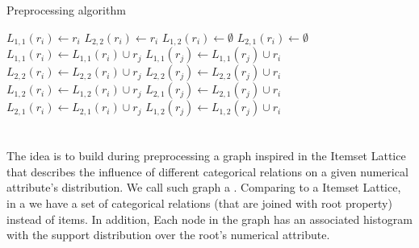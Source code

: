 \begin{algorithm}[!h]
  \caption{Preprocessing algorithm}
  \label{alg3}

     {
      $L_{1,1}(r_i) \leftarrow r_i$ \;
      $L_{2,2}(r_i) \leftarrow r_i$ \;
      $L_{1,2}(r_i) \leftarrow \emptyset$ \;
      $L_{2,1}(r_i) \leftarrow \emptyset$ \;
    }
     {
	 {
	     {
		 {
		    $L_{1,1}(r_i) \leftarrow L_{1,1}(r_i) \cup r_j$ \;
		    $L_{1,1}(r_j) \leftarrow L_{1,1}(r_j) \cup r_i$ \;
		}
		 {
		    $L_{2,2}(r_i) \leftarrow L_{2,2}(r_i) \cup r_j$ \;
		    $L_{2,2}(r_j) \leftarrow L_{2,2}(r_j) \cup r_i$ \;
		}
	    }
	     {
		$L_{1,2}(r_i) \leftarrow L_{1,2}(r_i) \cup r_j$ \;
		$L_{2,1}(r_j) \leftarrow L_{2,1}(r_j) \cup r_i$ \;
	    }
	     {
		$L_{2,1}(r_i) \leftarrow L_{2,1}(r_i) \cup r_j$ \;
		$L_{1,2}(r_j) \leftarrow L_{1,2}(r_j) \cup r_i$ \;
	    }
	}
   }
\end{algorithm}

\subsection{}

\section{\graphname}
\label{ch:lattice}

The idea is to build during preprocessing a graph inspired in the Itemset Lattice that describes the influence of
different categorical relations on a given numerical attribute's distribution. We call such graph a \graphname.
Comparing to a Itemset Lattice, in a \graphname we have a set of categorical relations (that are joined with root
property) instead of items. In addition, Each node in the graph has an associated histogram with the support
distribution over the root's numerical attribute.

